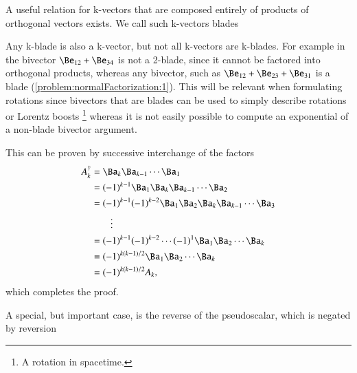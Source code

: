 %
%
A useful relation for k-vectors that are composed entirely of products of orthogonal vectors exists.  We call such k-vectors blades


Any k-blade is also a k-vector, but not all k-vectors are k-blades.  For example in  the bivector
\(
\Be_{12} + \Be_{34} \)
is not a 2-blade, since it cannot be factored into orthogonal products, whereas any  bivector, such as
\( \Be_{12} + \Be_{23} + \Be_{31} \) is a blade (\cref{problem:normalFactorization:1}).
This will be relevant when formulating rotations since bivectors that are blades can be used to simply describe rotations or Lorentz boosts
\footnote{A rotation in spacetime.} whereas it is not easily possible to compute an exponential of a non-blade bivector argument.


This can be proven by successive interchange of the factors
\begin{dmath}\label{eqn:reverse:81}
\begin{aligned}
A_k^\dagger
&= \Ba_k \Ba_{k-1} \cdots \Ba_1 \\
&= (-1)^{k-1} \Ba_1 \Ba_k \Ba_{k-1} \cdots \Ba_2 \\
&= (-1)^{k-1} (-1)^{k-2} \Ba_1 \Ba_2 \Ba_k \Ba_{k-1} \cdots \Ba_3 \\
&\qquad \vdots \\
&= (-1)^{k-1} (-1)^{k-2} \cdots (-1)^1 \Ba_1 \Ba_2 \cdots \Ba_k \\
&= (-1)^{k(k-1)/2} \Ba_1 \Ba_2 \cdots \Ba_k \\
&= (-1)^{k(k-1)/2} A_k,
\end{aligned}
\end{dmath}
which completes the proof.

A special, but important case, is the reverse of the  pseudoscalar, which is negated by reversion

